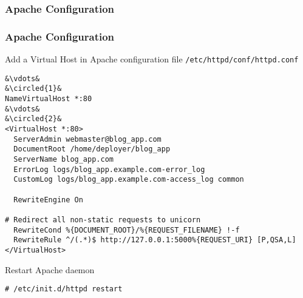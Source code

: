 \subsubsection{Apache Configuration}
\begin{frame}
\frametitle{Apache Configuration}

Add a Virtual Host in Apache configuration file \texttt{/etc/httpd/conf/httpd.conf}

\lstset{language=shell, escapechar=&}
\begin{lstlisting}
&\vdots&
&\circled{1}&
NameVirtualHost *:80
&\vdots&
&\circled{2}&
<VirtualHost *:80>
  ServerAdmin webmaster@blog_app.com
  DocumentRoot /home/deployer/blog_app
  ServerName blog_app.com
  ErrorLog logs/blog_app.example.com-error_log
  CustomLog logs/blog_app.example.com-access_log common

  RewriteEngine On

# Redirect all non-static requests to unicorn
  RewriteCond %{DOCUMENT_ROOT}/%{REQUEST_FILENAME} !-f 
  RewriteRule ^/(.*)$ http://127.0.0.1:5000%{REQUEST_URI} [P,QSA,L]
</VirtualHost>
\end{lstlisting}


Restart Apache daemon

\lstset{language=shell, escapechar=!}
\begin{lstlisting}[escapechar=!]
# /etc/init.d/httpd restart
\end{lstlisting}

\end{frame}




